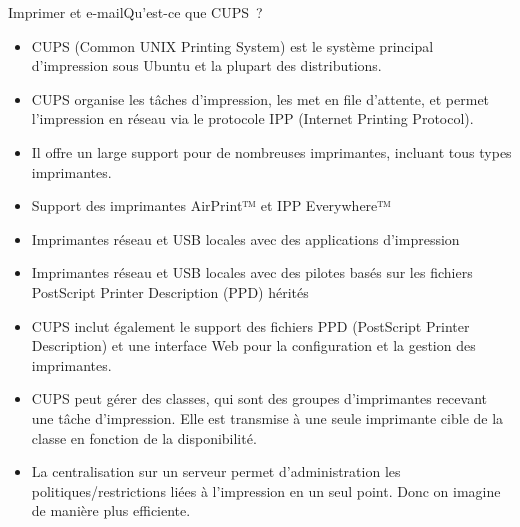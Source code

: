 \documentclass{beamer}
\begin{document}
    \begin{frame}{Imprimer et e-mail}{Qu'est-ce que CUPS~?}
        \begin{footnotesize}
            \begin{itemize}
                \item CUPS (Common UNIX Printing System) est le système principal d'impression sous Ubuntu et la plupart des distributions.
                \item CUPS organise les tâches d'impression, les met en file d'attente, et permet l'impression en réseau via le protocole IPP (Internet Printing Protocol).
                \item Il offre un large support pour de nombreuses imprimantes, incluant tous types imprimantes.
                \item Support des imprimantes AirPrint™ et IPP Everywhere™
                \item Imprimantes réseau et USB locales avec des applications d'impression
                \item Imprimantes réseau et USB locales avec des pilotes basés sur les fichiers PostScript Printer Description (PPD) hérités
                \item CUPS inclut également le support des fichiers PPD (PostScript Printer Description) et une interface Web pour la configuration et la gestion des imprimantes.
                \item CUPS peut gérer des classes, qui sont des groupes d'imprimantes recevant une tâche d'impression.
                Elle est transmise à une seule imprimante cible de la classe en fonction de la disponibilité.
                \item La centralisation sur un serveur permet d'administration les politiques/restrictions liées à l'impression en un seul point.
                Donc on imagine de manière plus efficiente.
            \end{itemize}
        \end{footnotesize}
    \end{frame}
\end{document}
